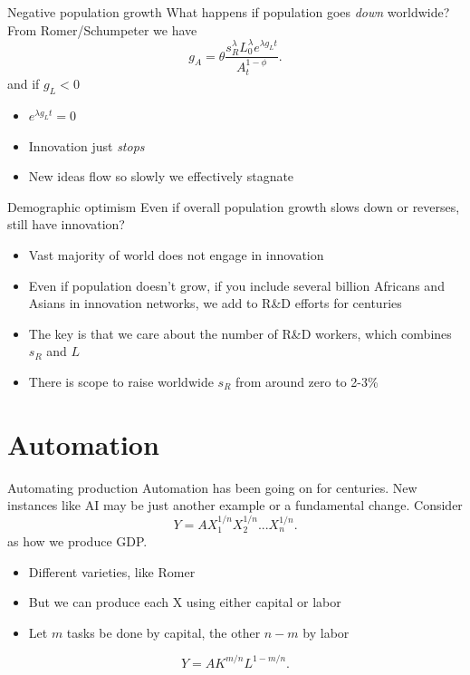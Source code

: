 \begin{frame}{Negative population growth}
What happens if population goes \textit{down} worldwide? From Romer/Schumpeter we have
\begin{equation}
	g_A = \theta \frac{s_R^{\lambda} L_0^{\lambda} e^{\lambda g_L t}}{A_t^{1-\phi}}. \nonumber
\end{equation}
and if $g_L <0$
\begin{itemize}
	\item $e^{\lambda g_L t} = 0$
	\item Innovation just \textit{stops}
	\item New ideas flow so slowly we effectively stagnate
\end{itemize}
\end{frame}

\begin{frame}{Demographic optimism}
Even if overall population growth slows down or reverses, still have innovation?
\begin{itemize}
	\item Vast majority of world does not engage in innovation
	\item Even if population doesn't grow, if you include several billion Africans and Asians in innovation networks, we add to R\&D efforts for centuries
	\item The key is that we care about the number of R\&D workers, which combines $s_R$ and $L$
	\item There is scope to raise worldwide $s_R$ from around zero to 2-3\% 
\end{itemize}
\end{frame}

\section{Automation}
\begin{frame}{Automating production}
Automation has been going on for centuries. New instances like AI may be just another example or a fundamental change. Consider
\begin{equation}
	Y = A X_1^{1/n} X_2^{1/n} ... X_n^{1/n}. \nonumber
\end{equation}
as how we produce GDP. 
\begin{itemize}
	\item Different varieties, like Romer
	\item But we can produce each X using either capital or labor
	\item Let $m$ tasks be done by capital, the other $n-m$ by labor
\end{itemize}
\begin{equation}
	Y = A K^{m/n} L^{1 - m/n}. \label{EQ_Y_mn}
\end{equation}
\end{frame}

